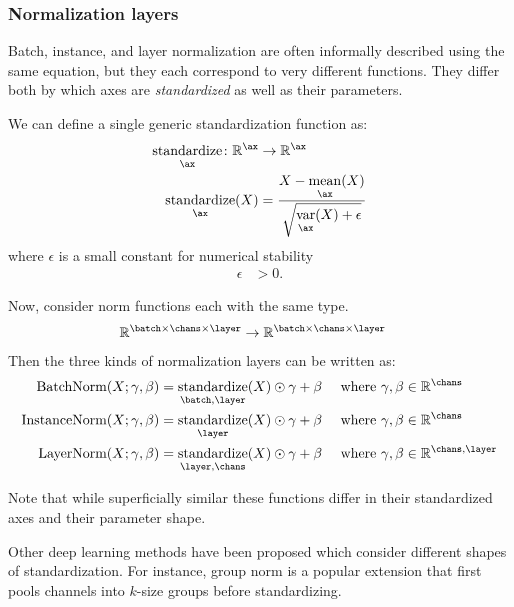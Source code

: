 \documentclass{article}
\newcommand{\reals}{\mathbb{R}}
\begin{document}
\subsubsection{Normalization layers}

Batch, instance, and layer normalization are often informally described using the same
equation, but they each correspond to very different functions. They differ
both by which axes are \textit{standardized} as well as their parameters.

We can define a single generic standardization function as:
\begin{align*}
  \nfun{\ax}{standardize} \colon \mathbb{R}^{\ax} &\rightarrow \mathbb{R}^{\ax} \\
  \nfun{\ax}{standardize}(X) &= \frac{X - \nfun{\ax}{mean}(X)}{\sqrt{\nfun{\ax}{var}(X) + \epsilon}}
\end{align*}
where $\epsilon$ is a small constant for numerical stability
\begin{align*}
  \epsilon &> 0.
\end{align*}

Now, consider norm functions each with the same type.
\begin{align*}
&\reals^{{\batch \times \chans \times \layer}} \rightarrow \reals^{{\batch \times \chans \times \layer}}
\end{align*}
Then the three kinds of normalization layers can be written as:
\begin{align*}
\text{BatchNorm}(X; \gamma, \beta) &= \nfun{\batch,\layer}{standardize}(X) \ndot{} \gamma + \beta &\text{ where } &  \gamma, \beta \in \mathbb{R}^{\chans} \\
\text{InstanceNorm}(X; \gamma, \beta) &= \nfun{\layer}{standardize}(X) \ndot{} \gamma + \beta  &\text{ where } &  \gamma, \beta \in \mathbb{R}^{\chans} \\
\text{LayerNorm}(X; \gamma, \beta) &= \nfun{\layer,\chans}{standardize}(X) \ndot{} \gamma + \beta  &\text{ where } &  \gamma, \beta \in \mathbb{R}^{\chans,\layer} \\
\end{align*}

Note that while superficially similar these functions differ in their standardized axes and their parameter shape. 

Other deep learning methods have been proposed which consider different shapes of standardization. For instance, group norm is a popular extension that first pools channels into $k$-size groups before standardizing. 
\end{document}

